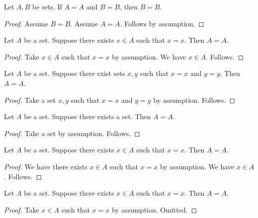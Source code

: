 \begin{proposition}\label{assume_right_conjunct}
    Let $A,B$ be sets.
    If $A=A$ and $B=B$, then $B=B$.
\end{proposition}
\begin{proof}
    Assume $B=B$.
    Assume $A=A$.
    Follows by assumption.
\end{proof}

\begin{proposition}\label{take_bounded}
    Let $A$ be a set.
    Suppose there exists $x\in A$ such that $x=x$.
    Then $A=A$.
\end{proposition}
\begin{proof}
    Take $x\in A$ such that $x=x$ by assumption.
    We have $x\in A$.
    Follows.
\end{proof}

\begin{proposition}\label{take_named_noun}
    Let $A$ be a set.
    Suppose there exist sets $x,y$ such that $x=x$ and $y=y$.
    Then $A=A$.
\end{proposition}
\begin{proof}
    Take a set $x,y$ such that $x=x$ and $y=y$ by assumption.
    Follows.
\end{proof}

\begin{proposition}\label{take_anonymous_noun}
    Let $A$ be a set.
    Suppose there exists a set.
    Then $A=A$.
\end{proposition}
\begin{proof}
    Take a set by assumption.
    Follows.
\end{proof}

\begin{proposition}\label{existential_have_witness}
    Let $A$ be a set.
    Suppose there exists $x\in A$ such that $x=x$.
    Then $A=A$.
\end{proposition}
\begin{proof}
    We have there exists $x\in A$ such that $x=x$ by assumption.
    We have $x\in A$.
    Follows.
\end{proof}

\begin{proposition}\label{take_omitted_continuation}
    Let $A$ be a set.
    Suppose there exists $x\in A$ such that $x=x$.
    Then $A=A$.
\end{proposition}
\begin{proof}
    Take $x\in A$ such that $x=x$ by assumption.
    Omitted.
\end{proof}

